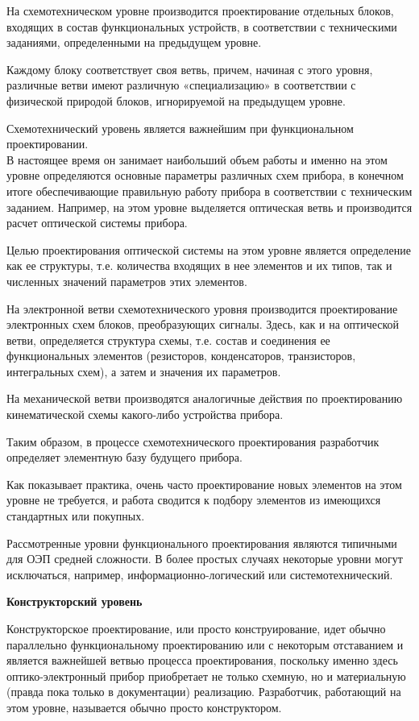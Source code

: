 На схемотехническом уровне производится проектирование отдельных блоков, входящих в состав функциональных устройств, в соответствии с техническими заданиями, определенными на предыдущем уровне.

Каждому блоку соответствует своя ветвь, причем, начиная с этого уровня, различные ветви имеют различную «специализацию» в соответствии с физической природой блоков, игнорируемой на предыдущем уровне.

Схемотехнический уровень является важнейшим при функциональном проектировании.\\ В настоящее время он занимает наибольший объем работы и именно на этом уровне определяются основные параметры различных схем прибора, в конечном итоге обеспечивающие правильную работу прибора в соответствии с техническим заданием. Например, на этом уровне выделяется оптическая ветвь и производится расчет оптической системы прибора.

Целью проектирования оптической системы на этом уровне является определение как ее структуры, т.е. количества входящих в нее элементов и их типов, так и численных значений параметров этих элементов.

На электронной ветви схемотехнического уровня производится проектирование электронных схем блоков, преобразующих сигналы. Здесь, как и на оптической ветви, определяется структура схемы, т.е. состав и соединения ее функциональных элементов (резисторов, конденсаторов, транзисторов, интегральных схем), а затем и значения их параметров.

На механической ветви производятся аналогичные действия по проектированию кинематической схемы какого-либо устройства прибора.

Таким образом, в процессе схемотехнического проектирования разработчик определяет элементную базу будущего прибора.

Как показывает практика, очень часто проектирование новых элементов на этом уровне не требуется, и работа сводится к подбору элементов из имеющихся стандартных или покупных.

Рассмотренные уровни функционального проектирования являются типичными для ОЭП средней сложности. В более простых случаях некоторые уровни могут исключаться, например, информационно-логический или системотехнический.

\begin{flushleft}
	\textbf{Конструкторский уровень}
\end{flushleft}

Конструкторское проектирование, или просто конструирование, идет обычно параллельно функциональному проектированию или с некоторым отставанием и является важнейшей ветвью процесса проектирования, поскольку именно здесь оптико-электронный прибор приобретает не только схемную, но и материальную (правда пока только в документации) реализацию. Разработчик, работающий на этом уровне, называется обычно просто конструктором. 

